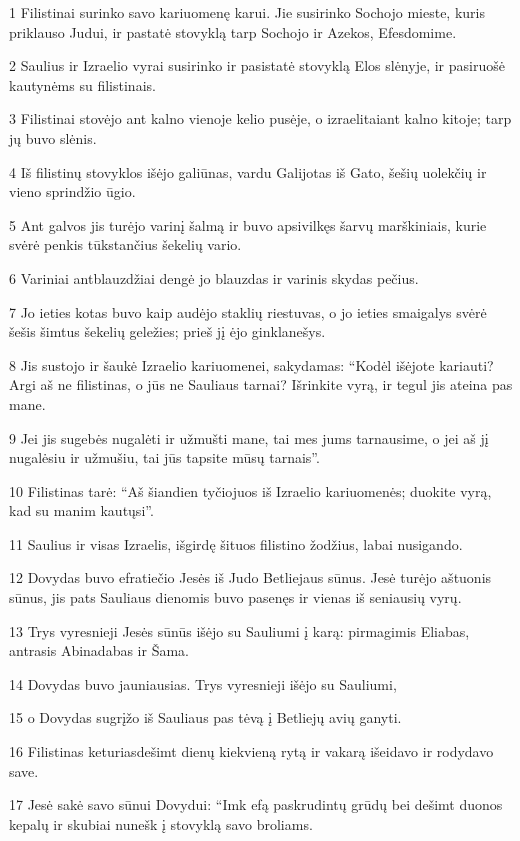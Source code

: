 \par 1 Filistinai surinko savo kariuomenę karui. Jie susirinko Sochojo mieste, kuris priklauso Judui, ir pastatė stovyklą tarp Sochojo ir Azekos, Efesdomime. 
\par 2 Saulius ir Izraelio vyrai susirinko ir pasistatė stovyklą Elos slėnyje, ir pasiruošė kautynėms su filistinais. 
\par 3 Filistinai stovėjo ant kalno vienoje kelio pusėje, o izraelitai­ant kalno kitoje; tarp jų buvo slėnis. 
\par 4 Iš filistinų stovyklos išėjo galiūnas, vardu Galijotas iš Gato, šešių uolekčių ir vieno sprindžio ūgio. 
\par 5 Ant galvos jis turėjo varinį šalmą ir buvo apsivilkęs šarvų marškiniais, kurie svėrė penkis tūkstančius šekelių vario. 
\par 6 Variniai antblauzdžiai dengė jo blauzdas ir varinis skydas pečius. 
\par 7 Jo ieties kotas buvo kaip audėjo staklių riestuvas, o jo ieties smaigalys svėrė šešis šimtus šekelių geležies; prieš jį ėjo ginklanešys. 
\par 8 Jis sustojo ir šaukė Izraelio kariuomenei, sakydamas: “Kodėl išėjote kariauti? Argi aš ne filistinas, o jūs ne Sauliaus tarnai? Išrinkite vyrą, ir tegul jis ateina pas mane. 
\par 9 Jei jis sugebės nugalėti ir užmušti mane, tai mes jums tarnausime, o jei aš jį nugalėsiu ir užmušiu, tai jūs tapsite mūsų tarnais”. 
\par 10 Filistinas tarė: “Aš šiandien tyčiojuos iš Izraelio kariuomenės; duokite vyrą, kad su manim kautųsi”. 
\par 11 Saulius ir visas Izraelis, išgirdę šituos filistino žodžius, labai nusigando. 
\par 12 Dovydas buvo efratiečio Jesės iš Judo Betliejaus sūnus. Jesė turėjo aštuonis sūnus, jis pats Sauliaus dienomis buvo pasenęs ir vienas iš seniausių vyrų. 
\par 13 Trys vyresnieji Jesės sūnūs išėjo su Sauliumi į karą: pirmagimis Eliabas, antrasis Abinadabas ir Šama. 
\par 14 Dovydas buvo jauniausias. Trys vyresnieji išėjo su Sauliumi, 
\par 15 o Dovydas sugrįžo iš Sauliaus pas tėvą į Betliejų avių ganyti. 
\par 16 Filistinas keturiasdešimt dienų kiekvieną rytą ir vakarą išeidavo ir rodydavo save. 
\par 17 Jesė sakė savo sūnui Dovydui: “Imk efą paskrudintų grūdų bei dešimt duonos kepalų ir skubiai nunešk į stovyklą savo broliams. 
